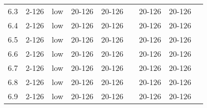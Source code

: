 \documentclass{article}
\begin{document}
\begin{center}
\begin{center}
\begin{tabular}{| c | c | c | c | c | c | c | c | c |}
      6.3 & 2-126 & low & 20-126 & 20-126 &  & 20-126 & 20-126 &\\
      6.4 & 2-126 & low & 20-126 & 20-126 &  & 20-126 & 20-126 &\\
      6.5 & 2-126 & low & 20-126 & 20-126 &  & 20-126 & 20-126 &\\
      6.6 & 2-126 & low & 20-126 & 20-126 &  & 20-126 & 20-126 &\\
      6.7 & 2-126 & low & 20-126 & 20-126 &  & 20-126 & 20-126 &\\
      6.8 & 2-126 & low & 20-126 & 20-126 &  & 20-126 & 20-126 &\\
      6.9 & 2-126 & low & 20-126 & 20-126 &  & 20-126 & 20-126 &\\
      \hline
    \end{tabular}
    \end{center}

\end{center}
\end{document}
